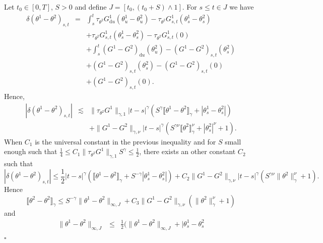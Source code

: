 \documentclass[a4paper,11pt]{article}
\newcommand{\mathd}{\mathrm{d}}
\newenvironment{proof}{{\sc Proof.}}{\hfill$\square$}
\begin{document}
\begin{proof}
  Let $t_{0} \in [ 0,T ]$, $S>0$ and define $J= [ t_{0} , ( t_{0} +S ) \wedge
  1 ]$. For $s \leqslant t \in J$ we have
  \begin{eqnarray*}
    \delta ( \theta^{1} - \theta^{2} )_{s,t} & = & \int_{s}^{t}
    \tau_{\theta^{2}} G^{1}_{\mathd u} ( \theta^{1}_{u} - \theta^{2}_{u} ) -
    \tau_{\theta^{2}} G^{1}_{s,t} ( \theta^{1}_{s} - \theta^{2}_{s} )\\
    &  & + \tau_{\theta^{2}} G^{1}_{s,t} ( \theta^{1}_{s} - \theta^{2}_{s} )
    - \tau_{\theta^{2}} G^{1}_{s,t} ( 0 )\\
    &  & + \int_{s}^{t} ( G^{1} -G^{2} )_{\mathd u} ( \theta^{2}_{u} ) - (
    G^{1} -G^{2} )_{s,t} ( \theta^{2}_{s} )\\
    &  & + ( G^{1} -G^{2} )_{s,t} ( \theta^{2}_{s} ) - ( G^{1} -G^{2} )_{s,t}
    ( 0 )\\
    &  & + ( G^{1} -G^{2} )_{s,t} ( 0 ).
  \end{eqnarray*}
  Hence,
  \begin{eqnarray*}
    | \delta ( \theta^{1} - \theta^{2} )_{s,t} | & \lesssim & \|
    \tau_{\theta^{2}} G^{1} \|_{\gamma ,1} | t-s |^{\gamma} ( S^{\gamma}
    \llbracket \theta^{1} - \theta^{2} \rrbracket_{\gamma} + | \theta^{1}_{s}
    - \theta^{2}_{s} | )\\
    &  & + \| G^{1} -G^{2} \|_{\gamma , \nu} | t-s |^{\gamma} ( S^{\gamma
    \nu} \llbracket \theta^{2} \rrbracket_{\gamma}^{\nu} + | \theta^{2}_{s}
    |^{\nu} +1 ) .
  \end{eqnarray*}
  When $C_{1}$ is the universal constant in the previous inequality and for
  $S$ small enough such that $\frac{1}{4} \leqslant C_{1} \| \tau_{\theta^{2}}
  G^{1} \|_{\gamma ,1} S^{\gamma} \leqslant \frac{1}{2}$, there exists an
  other constant $C_{2}$ such that
  \[ | \delta ( \theta^{1} - \theta^{2} )_{s,t} | \leqslant \frac{1}{2} | t-s
     |^{\gamma} ( \llbracket \theta^{1} - \theta^{2} \rrbracket_{\gamma} +S^{-
     \gamma} | \theta^{1}_{s} - \theta^{2}_{s} | ) +C_{2} \| G^{1} -G^{2}
     \|_{\gamma , \nu} | t-s |^{\gamma} ( S^{\gamma \nu} \| \theta^{2}
     \|^{\nu}_{\gamma} +1 ) . \]
  Hence
  \[ \llbracket \theta^{2} - \theta^{2} \rrbracket_{\gamma} \leqslant S^{-
     \gamma} \| \theta^{1} - \theta^{2} \|_{\infty ,J} +C_{3} \| G^{1} -G^{2}
     \|_{\gamma , \nu} ( \| \theta^{2} \|^{\nu}_{\gamma} +1 ) \]
  and
  \begin{eqnarray*}
    \| \theta^{1} - \theta^{2} \|_{\infty ,J} & \leqslant & \frac{1}{2} ( \|
    \theta^{1} - \theta^{2} \|_{\infty ,J} + | \theta^{1}_{s} - \theta^{2}_{s}

\end{eqnarray*}
\end{proof}
\end{document}
